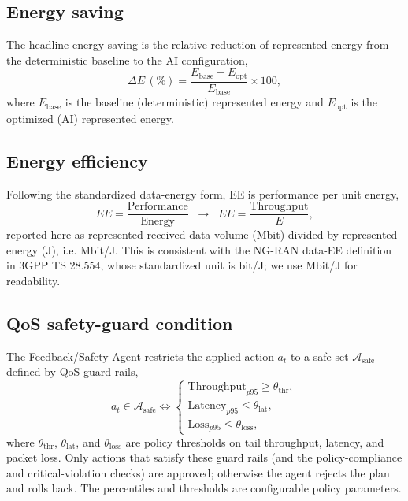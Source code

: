 \documentclass[conference]{IEEEtran}
\begin{document}
\subsection{Energy saving}
The headline energy saving is the relative reduction of represented energy from the deterministic baseline to the AI configuration,
\begin{equation}
\Delta E\,(\%) = \frac{E_{\mathrm{base}} - E_{\mathrm{opt}}}{E_{\mathrm{base}}}\times 100, \label{eq:es}
\end{equation}
where $E_{\mathrm{base}}$ is the baseline (deterministic) represented energy and $E_{\mathrm{opt}}$ is the optimized (AI) represented energy.

\subsection{Energy efficiency}
Following the standardized data-energy form, EE is performance per unit energy,
\begin{equation}
EE = \frac{\mathrm{Performance}}{\mathrm{Energy}} \;\;\longrightarrow\;\; EE = \frac{\mathrm{Throughput}}{E}, \label{eq:ee}
\end{equation}
reported here as represented received data volume (Mbit) divided by represented energy (J), i.e. Mbit/J. This is consistent with the NG-RAN data-EE definition in 3GPP TS 28.554, whose standardized unit is bit/J; we use Mbit/J for readability.

\subsection{QoS safety-guard condition}
The Feedback/Safety Agent restricts the applied action $a_t$ to a safe set $\mathcal{A}_{\mathrm{safe}}$ defined by QoS guard rails,
\begin{equation}
a_t \in \mathcal{A}_{\mathrm{safe}} \iff
\begin{cases}
\mathrm{Throughput}_{p95} \ge \theta_{\mathrm{thr}}, \\
\mathrm{Latency}_{p95} \le \theta_{\mathrm{lat}}, \\
\mathrm{Loss}_{p95} \le \theta_{\mathrm{loss}},
\end{cases}\label{eq:safe}
\end{equation}
where $\theta_{\mathrm{thr}}$, $\theta_{\mathrm{lat}}$, and $\theta_{\mathrm{loss}}$ are policy thresholds on tail throughput, latency, and packet loss. Only actions that satisfy these guard rails (and the policy-compliance and critical-violation checks) are approved; otherwise the agent rejects the plan and rolls back. The percentiles and thresholds are configurable policy parameters.
\end{document}
